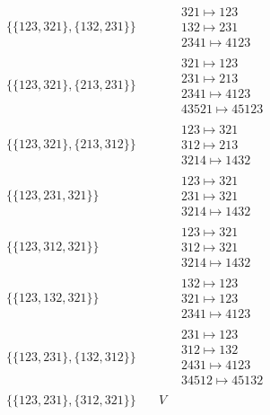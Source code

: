 \begin{tiny}
\begin{align}
\begin{matrix}
\end{matrix}
\\
\{\{123, 321\}, \{132, 231\}\}
\quad
&
\phantom{.}
&
\begin{matrix}
321 \mapsto 123\\132 \mapsto 231\\2341 \mapsto 4123
\end{matrix}
\\
\{\{123, 321\}, \{213, 231\}\}
\quad
&
\phantom{.}
&
\begin{matrix}
321 \mapsto 123\\231 \mapsto 213\\2341 \mapsto 4123\\43521 \mapsto 45123
\end{matrix}
\\
\{\{123, 321\}, \{213, 312\}\}
\quad
&
\phantom{.}
&
\begin{matrix}
123 \mapsto 321\\312 \mapsto 213\\3214 \mapsto 1432
\end{matrix}
\\
\{\{123, 231, 321\}\}
\quad
&
\phantom{.}
&
\begin{matrix}
123 \mapsto 321\\231 \mapsto 321\\3214 \mapsto 1432
\end{matrix}
\\
\{\{123, 312, 321\}\}
\quad
&
\phantom{.}
&
\begin{matrix}
123 \mapsto 321\\312 \mapsto 321\\3214 \mapsto 1432
\end{matrix}
\\
\{\{123, 132, 321\}\}
\quad
&
\phantom{.}
&
\begin{matrix}
132 \mapsto 123\\321 \mapsto 123\\2341 \mapsto 4123
\end{matrix}
\\
\{\{123, 231\}, \{132, 312\}\}
\quad
&
\phantom{.}
&
\begin{matrix}
231 \mapsto 123\\312 \mapsto 132\\2431 \mapsto 4123\\34512 \mapsto 45132
\end{matrix}
\\
\{\{123, 231\}, \{312, 321\}\}
\quad
&
V
&
\begin{matrix}

\end{matrix}
\end{align}
\end{tiny}
